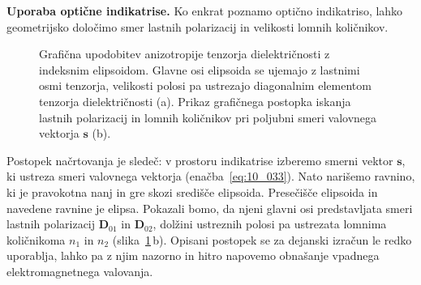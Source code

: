 \begin{example}{\bf Uporaba optične indikatrise.} 
\label{chap:ind2}
Ko enkrat poznamo optično indikatriso, lahko 
geometrijsko določimo smer lastnih polarizacij in velikosti
lomnih količnikov.
\begin{figure}[h]
\centering
\def\svgwidth{120truemm} 

\caption{Grafična upodobitev anizotropije tenzorja dielektričnosti z indeksnim
elipsoidom. Glavne osi elipsoida se ujemajo z lastnimi osmi tenzorja, velikosti
polosi pa ustrezajo diagonalnim elementom tenzorja dielektričnosti (a). Prikaz grafičnega
postopka iskanja lastnih polarizacij in lomnih količnikov pri poljubni smeri valovnega
vektorja $\mathbf{s}$ (b).}
\label{fig:10_indikatrisa}
\end{figure}
Postopek načrtovanja je sledeč: v prostoru indikatrise izberemo smerni 
vektor $\mathbf{s}$, ki ustreza smeri valovnega vektorja (enačba~\ref{eq:10_033}). Nato 
narišemo ravnino, ki je pravokotna nanj in gre skozi središče elipsoida. 
Presečišče elipsoida in navedene ravnine je elipsa. Pokazali bomo, da njeni 
glavni osi predstavljata smeri lastnih polarizacij $\mathbf{D}_{01}$ in 
$\mathbf{D}_{02}$, dolžini ustreznih polosi pa ustrezata lomnima količnikoma 
$n_1$ in $n_2$ (slika~\ref{fig:10_indikatrisa}\,b). Opisani postopek se za dejanski 
izračun le redko uporablja, lahko pa z njim  
nazorno in hitro napovemo obnašanje vpadnega elektromagnetnega valovanja. 


\end{example}
